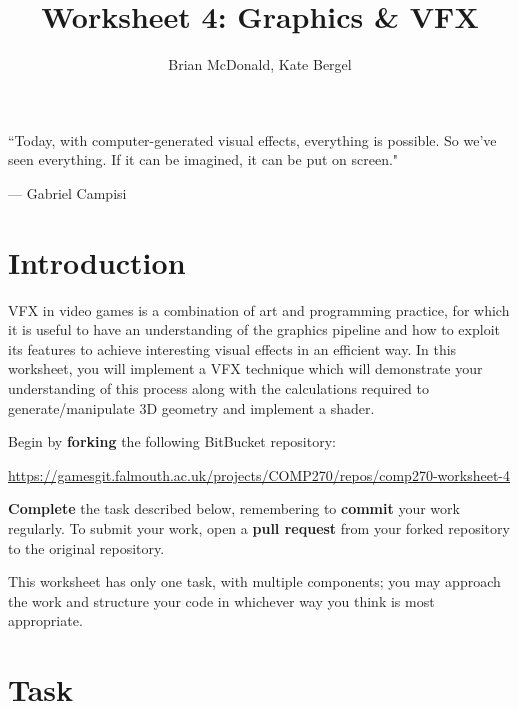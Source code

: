 \documentclass{../../../fal_assignment}
\title{Worksheet 4: Graphics \& VFX}
\author{Brian McDonald, Kate Bergel}
\begin{document}
\maketitle

\begin{marginquote}
``Today, with computer-generated visual effects, everything is possible. So we've seen everything. If it can be imagined, it can be put on screen."

\par --- Gabriel Campisi
\end{marginquote}

\section*{Introduction}

VFX in video games is a combination of art and programming practice, for which it is useful to have an understanding of the graphics pipeline and how to exploit its features to achieve interesting visual effects in an efficient way. In this worksheet, you will implement a VFX technique which will demonstrate your understanding of this process along with the calculations required to generate/manipulate 3D geometry and implement a shader.

Begin by \textbf{forking} the following BitBucket repository:

\begin{center}
	\url{https://gamesgit.falmouth.ac.uk/projects/COMP270/repos/comp270-worksheet-4}
\end{center}

\textbf{Complete} the task described below, remembering to \textbf{commit} your work regularly.
To submit your work, open a \textbf{pull request} from your forked repository to the original repository.

This worksheet has only one task, with multiple components; you may approach the work and structure your code in whichever way you think is most appropriate.

\section*{Task}

\end{document}

